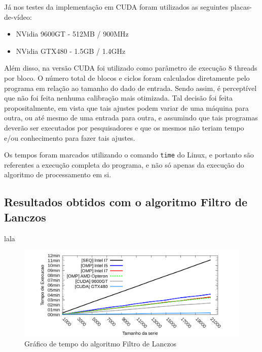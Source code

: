 Já nos testes da implementação em CUDA foram utilizados as seguintes placas-de-vídeo:

\begin{itemize}
\item NVidia	 9600GT - 512MB / 900MHz
\item NVidia GTX480 - 1.5GB / 1.4GHz
\end{itemize}

Além disso, na versão CUDA foi utilizado como parâmetro de execução 8 threads por bloco. O número total de blocos e ciclos foram calculados diretamente pelo programa em relação ao tamanho do dado de entrada. Sendo assim, é perceptível que não foi feita nenhuma calibração mais otimizada. Tal decisão foi feita propositalmente, em vista que tais ajustes podem variar de uma máquina para outra, ou até mesmo de uma entrada para outra, e assumindo que tais programas deverão ser executados por pesquisadores e que os mesmos não teriam tempo e/ou conhecimento para fazer tais ajustes.

Os tempos foram marcados utilizando o comando \texttt{time} do Linux, e portanto são referentes a execução completa do programa, e não só apenas da execução do algoritmo de processamento em si.

\subsection{Resultados obtidos com o algoritmo Filtro de Lanczos}

lala

\begin{figure}[H]
\centering
\includegraphics[width=1.0\textwidth]{Imagens/graficos_lanczos/lanczos_tempos.png}
\caption{Gráfico de tempo do algoritmo Filtro de Lanczos}
\label{fig:grafico_tempo_lanczos}
\end{figure}

